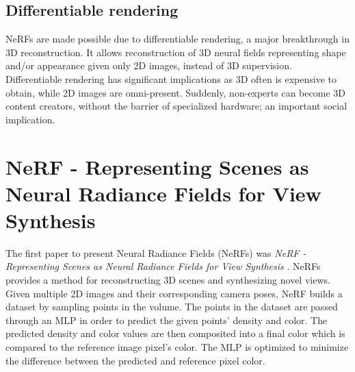 \subsection{Differentiable rendering} %
NeRFs are made possible due to differentiable rendering, a major breakthrough in 3D reconstruction. It allows reconstruction of 3D neural fields representing shape and/or appearance given only 2D images, instead of 3D supervision. Differentiable rendering has significant implications as 3D often is expensive to obtain, while 2D images are omni-present. Suddenly, non-experts can become 3D content creators, without the barrier of specialized hardware; an important social implication\cite{xieNeuralFieldsVisual2022}.




\section{NeRF - Representing Scenes as Neural Radiance Fields for View Synthesis}
The first paper to present Neural Radiance Fields (NeRFs) was \textit{NeRF - Representing Scenes as Neural Radiance Fields for View Synthesis} \cite{mildenhall_nerf_2020}. NeRFs provides a method for reconstructing 3D scenes and synthesizing novel views. Given multiple 2D images and their corresponding camera poses, NeRF builds a dataset by sampling points in the volume. The points in the dataset are passed through an MLP in order to predict the given points' density and color. The predicted density and color values are then composited into a final color which is compared to the reference image pixel's color. The MLP is optimized to minimize the difference between the predicted and reference pixel color.


